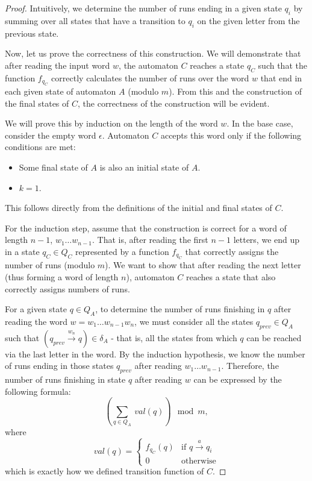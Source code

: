 \documentclass[en]{pracamgr}
\theoremstyle{definition}
\begin{document}
\begin{proof}
    Intuitively, we determine the number of runs ending in a given state $q_i$ by summing over all states that have a transition to $q_i$ on the given letter from the previous state.

    Now, let us prove the correctness of this construction. We will demonstrate that after reading the input word $w$, the automaton $C$ reaches a state $q_C$ such that the function $f_{q_C}$ correctly calculates the number of runs over the word $w$ that end in each given state of automaton $A$ (modulo $m$). From this and the construction of the final states of $C$, the correctness of the construction will be evident.

    We will prove this by induction on the length of the word $w$. In the base case, consider the empty word $\epsilon$. Automaton $C$ accepts this word only if the following conditions are met:
    \begin{itemize}
        \item Some final state of $A$ is also an initial state of $A$.
        \item $k = 1$.
    \end{itemize}
    This follows directly from the definitions of the initial and final states of $C$.
    
    For the induction step, assume that the construction is correct for a word of length $n-1$, $w_1 \ldots w_{n-1}$. That is, after reading the first $n-1$ letters, we end up in a state $q_C \in Q_C$ represented by a function $f_{q_C}$ that correctly assigns the number of runs (modulo $m$). We want to show that after reading the next letter (thus forming a word of length $n$), automaton $C$ reaches a state that also correctly assigns numbers of runs. 
    
    For a given state $q \in Q_A$, to determine the number of runs finishing in $q$ after reading the word $w = w_1\ldots w_{n-1}w_n$, we must consider all the states $q_{prev} \in Q_A$ such that $(q_{prev} \xrightarrow{w_n} q) \in \delta_A$ - that is, all the states from which $q$ can be reached via the last letter in the word. By the induction hypothesis, we know the number of runs ending in those states $q_{prev}$ after reading $w_1 \ldots w_{n-1}$. Therefore, the number of runs finishing in state $q$ after reading $w$ can be expressed by the following formula:
    $$(\sum_{q \in Q_A} \ val(q)) \mod m,$$
    where
    \begin{equation*}
        val(q) =
            \begin{cases}
            f_{q_C}(q) & \text{if $q \xrightarrow{a} q_i$} \\
            0 & \text{otherwise}
            \end{cases}       
    \end{equation*}
    which is exactly how we defined transition function of $C$.
\end{proof}
\end{document}
